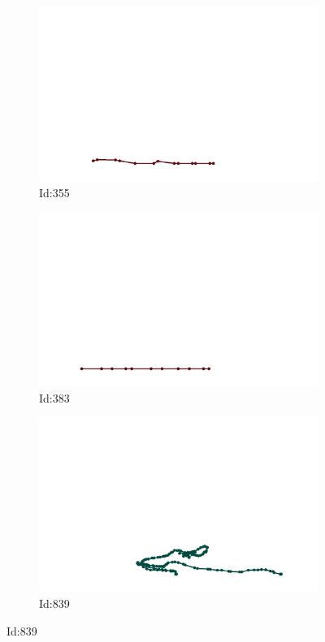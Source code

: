 \documentclass[12pt,twoside]{report}
\begin{document}
\begin{figure}
\centering
\begin{subfigure}[b]{0.20\textwidth}
\centering
\includegraphics[width=\textwidth]{../../trajectories/355.png}
\caption{Id:355}
\end{subfigure}
\begin{subfigure}[b]{0.20\textwidth}
\centering
\includegraphics[width=\textwidth]{../../trajectories/383.png}
\caption{Id:383}
\end{subfigure}
\begin{subfigure}[b]{0.20\textwidth}
\centering
\includegraphics[width=\textwidth]{../../trajectories/839.png}
\caption{Id:839}
\end{subfigure}
\end{figure}
\end{document}

